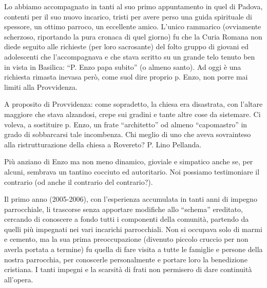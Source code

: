 Lo abbiamo accompagnato in tanti al suo primo appuntamento in quel di Padova, contenti per il suo 
nuovo incarico, tristi per avere perso una guida spirituale di spessore, un ottimo parroco, un 
eccellente amico. L’unico rammarico (ovviamente scherzoso, riportando la pura cronaca di quel 
giorno) fu che la Curia Romana non diede seguito alle richieste  (per loro sacrosante) del folto 
gruppo di giovani ed adolescenti che l’accompagnava e che stava scritto su un grande telo tenuto 
ben in vista in Basilica: “P. Enzo papa subito” (o almeno santo). Ad oggi è una richiesta rimasta 
inevasa però, come suol dire proprio p. Enzo, non porre mai limiti alla Provvidenza. 

A proposito di Provvidenza: come sopradetto, la chiesa era disastrata, con l’altare maggiore 
che stava alzandosi, crepe sui gradini e tante altre cose da sistemare. Ci voleva, a sostituire p. Enzo, 
un frate “architetto” od almeno “capomastro” in grado di sobbarcarsi tale incombenza.
Chi meglio di uno che aveva sovrainteso alla ristrutturazione della chiesa a Rovereto? P. Lino 
Pellanda.

Più anziano di Enzo ma non meno dinamico, gioviale e simpatico anche se, per alcuni, sembrava un 
tantino cocciuto ed autoritario. Noi possiamo testimoniare il contrario (od anche il contrario del 
contrario?).

Il primo anno (2005-2006), con l’esperienza accumulata in tanti anni di impegno parrocchiale, li 
trascorse senza apportare modifiche allo “schema” ereditato, cercando di conoscere a fondo tutti i 
componenti della comunità, partendo da quelli più impegnati nei vari incarichi parrocchiali.
Non si occupava solo di marmi e cemento, ma la sua prima preoccupazione (divenuto piccolo 
cruccio per non averla portata a termine) fu quella di fare visita a tutte le famiglie e persone della 
nostra parrocchia, per conoscerle personalmente e portare loro la benedizione cristiana. I tanti 
impegni e la scarsità di frati non permisero di dare continuità all’opera.


